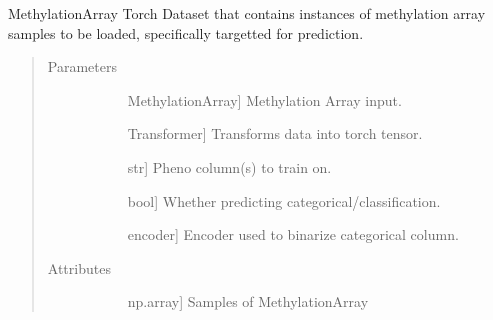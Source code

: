 \documentclass[letterpaper,10pt,english]{sphinxmanual}
\begin{document}
\begin{fulllineitems}
\begin{fulllineitems}
\begin{quote}
\begin{description}
\end{description}\end{quote}

\end{fulllineitems}


\end{fulllineitems}


\begin{fulllineitems}
\label{\detokenize{index:methylnet.datasets.MethylationPredictionDataSet}}
MethylationArray Torch Dataset that contains instances of methylation array samples to be loaded, specifically targetted for prediction.
\begin{quote}\begin{description}
\item[{Parameters}] \leavevmode\begin{description}
\item[{}] \leavevmode{[}MethylationArray{]}
Methylation Array input.

\item[{}] \leavevmode{[}Transformer{]}
Transforms data into torch tensor.

\item[{}] \leavevmode{[}str{]}
Pheno column(s) to train on.

\item[{}] \leavevmode{[}bool{]}
Whether predicting categorical/classification.

\item[{}] \leavevmode{[}encoder{]}
Encoder used to binarize categorical column.

\end{description}

\item[{Attributes}] \leavevmode\begin{description}
\item[{}] \leavevmode{[}np.array{]}
Samples of MethylationArray


\end{description}
\end{description}
\end{quote}
\end{fulllineitems}
\end{document}
